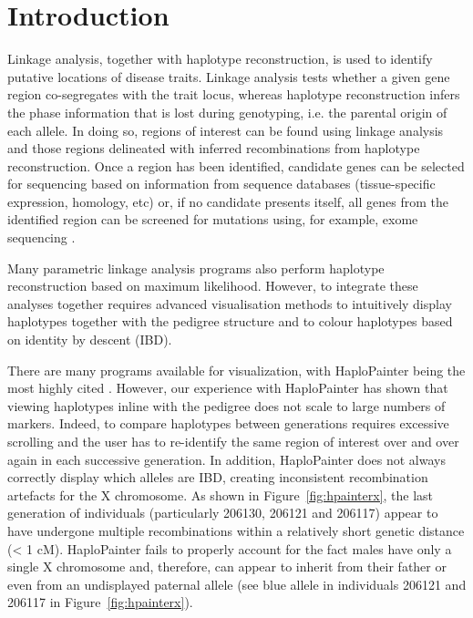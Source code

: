 \documentclass{assets/biotemplate/bioinfo}
\numberwithin{equation}{section}
\def\hpainter{{HaploPainter}}
\begin{document}
\maketitle

\section{Introduction}
Linkage analysis, together with haplotype reconstruction, is used to identify putative locations of disease traits. Linkage analysis tests whether a given gene region co-segregates with the trait locus, whereas haplotype reconstruction infers the phase information that is lost during genotyping, i.e. the parental origin of each allele. In doing so, regions of interest can be found using linkage analysis and those regions delineated with inferred recombinations from haplotype reconstruction. Once a region has been identified, candidate genes can be selected for sequencing based on information from sequence databases (tissue-specific expression, homology, etc) or, if no candidate presents itself, all genes from the identified region can be screened for mutations using, for example, exome sequencing \citep{bockenhauer2012genetic}.

Many parametric linkage analysis programs also perform haplotype reconstruction based on maximum likelihood. However, to integrate these analyses together requires advanced visualisation methods to intuitively display haplotypes together with the pedigree structure and to colour haplotypes based on identity by descent (IBD).

There are many programs available for visualization, with \hpainter{} being the most highly cited \citep{hpaint}. However, our experience with \hpainter{} has shown that viewing haplotypes inline with the pedigree does not scale to large numbers of markers. Indeed, to compare haplotypes between generations requires excessive scrolling and the user has to re-identify the same region of interest over and over again in each successive generation. In addition, \hpainter{} does not always correctly display which alleles are IBD, creating inconsistent recombination artefacts for the X chromosome. As shown in Figure~\ref{fig:hpainterx}, the last generation of individuals (particularly 206130, 206121 and 206117) appear to have undergone multiple recombinations within a relatively short genetic distance (< 1 cM).
%
\hpainter{} fails to properly account for the fact males have only a single X chromosome and, therefore, can appear to inherit from their father or even from an undisplayed paternal allele (see blue allele in individuals 206121 and 206117 in Figure~\ref{fig:hpainterx}).
\end{document}
